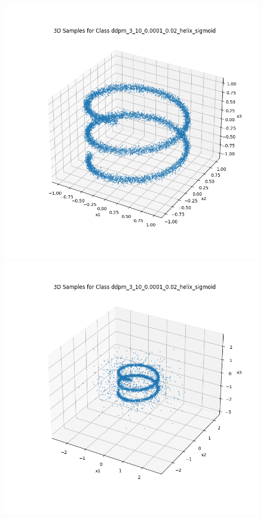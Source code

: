 \documentclass[a4paper,12pt]{article}
\begin{document}
\begin{figure}[h]
  \centering
  \begin{minipage}{0.3\textwidth}
      \centering
      \includegraphics[width=\linewidth]{images/helix.png}
  \end{minipage}
  \begin{minipage}{0.3\textwidth}
      \centering
      \includegraphics[width=\linewidth]{"images/Samples for ddpm_3_10_0.0001_0.02_helix_sigmoid.png"}

\end{minipage}
\end{figure}
\end{document}

